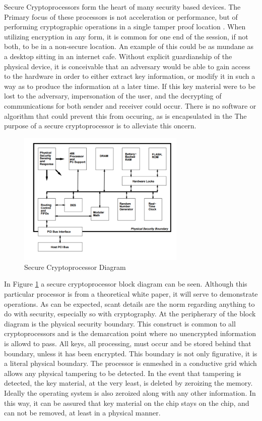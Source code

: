 \documentclass[journal]{IEEEtran}
\begin{document}
Secure Cryptoprocessors form the heart of many security based devices.  The Primary focus of these processors is not acceleration or performance, but of performing cryptographic operations in a single tamper proof location \cite{coprocesserWhitePaper}.  When utilizing encryption in any form, it is common for one end of the session, if not both, to be in a non-secure location.  An example of this could be as mundane as a desktop sitting in an internet cafe.  Without explicit guardianship of the physical device, it is conceivable that an adversary would be able to gain access to the hardware in order to either extract key information, or modify it in such a way as to produce the information at a later time.  If this key material were to be lost to the adversary, impersonation of the user, and the decrypting of communications for both sender and receiver could occur.  There is no software or algorithm that could prevent this from occuring, as is encapsulated in the The purpose of a secure cryptoprocessor is to alleviate this oncern.  

\begin{figure}[htbp]
	\centering
	\includegraphics[width=8cm,keepaspectratio]{img/coprocessorDiagram.png}
	\caption{Secure Cryptoprocessor Diagram \cite{coprocesserWhitePaper} }
	\label{coprocessorDiagram}
\end{figure}

In Figure \ref{coprocessorDiagram} a secure cryptoprocessor block diagram can be seen.  Although this particular processor is from a theoretical white paper, it will serve to demonstrate operations.  As can be expected, scant details are the norm regarding anything to do with security, especially so with cryptography.  At the peripherary of the block diagram is the physical security boundary.  This construct is common to all cryptoprocessors and is the demarcation point where no unencrypted information is allowd to pass.  All keys, all processing, must occur and be stored behind that boundary, unless it has been encrypted.  This boundary is not only figurative, it is a literal physical boundary.  The processor is enmeshed in a conductive grid \cite{coprocesserWhitePaper} which allows any physical tampering to be detected.  In the event that tampering is detected, the key material, at the very least, is deleted by zeroizing the memory.  Ideally the operating system is also zeroized along with any other information.  In this way, it can be assured that key material on the chip stays on the chip, and can not be removed, at least in a physical manner.
\end{document}
